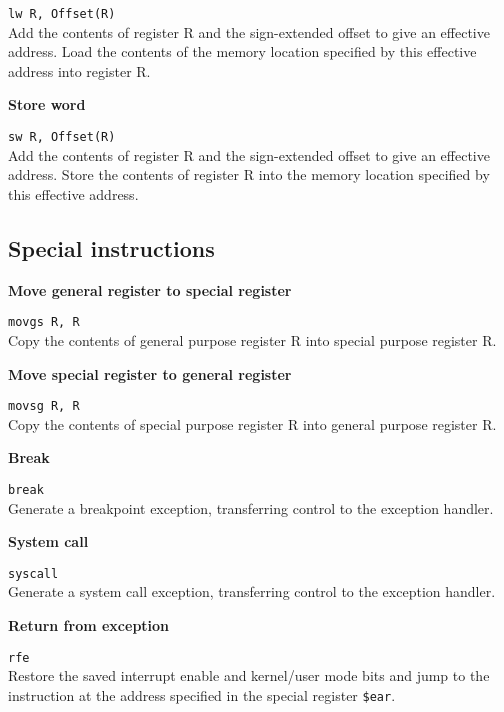 \documentclass[12pt]{report}
\newcommand\subscr[1]{\raisebox{-0.5ex}{\small #1}}
\newcommand\regs{R\subscr{s}}
\newcommand\regd{R\subscr{d}}
\begin{document}
\texttt{lw \regd, Offset(\regs{})}\\
Add the contents of register \regs{} and the sign-extended offset to
give an effective address. Load the contents of the memory location
specified by this effective address into register \regd{}.
\vspace{1ex}

\noindent
{\bf Store word}

\texttt{sw \regd, Offset(\regs{})}\\
Add the contents of register \regs{} and the sign-extended offset to
give an effective address. Store the contents of register \regd{} into
the memory location specified by this effective address.
\vspace{1ex}

\subsection{Special instructions}

\noindent
{\bf Move general register to special register}

\texttt{movgs \regd, \regs}\\
Copy the contents of general purpose register \regs{} into special purpose register \regd{}.
\vspace{1ex}

\noindent
{\bf Move special register to general register}

\texttt{movsg \regd, \regs}\\
Copy the contents of special purpose register \regs{} into general purpose register \regd{}.
\vspace{1ex}

\noindent
{\bf Break}

\texttt{break}\\
Generate a breakpoint exception, transferring control to the exception handler.
\vspace{1ex}

\noindent
{\bf System call}

\texttt{syscall}\\
Generate a system call exception, transferring control to the exception handler.
\vspace{1ex}

\noindent
{\bf Return from exception}

\texttt{rfe}\\
Restore the saved interrupt enable and kernel/user mode bits and jump to
the instruction at the address specified in the special register \texttt{\$ear}.
\vspace{1ex}
\end{document}
